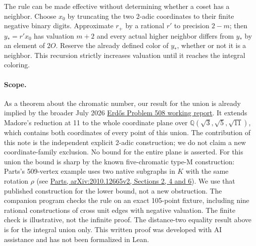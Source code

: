 \documentclass[10pt,letterpaper]{article}
\begin{document}
The rule can be made effective without determining whether a coset
has a neighbor. Choose \(x_0\) by truncating the two \(2\)-adic
coordinates to their finite negative binary digits. Approximate
\(r_+\) by a rational \(r'\) to precision \(2-m\);
then \(y_*=r'x_0\) has valuation \(m+2\) and every actual higher
neighbor differs from \(y_*\) by an element of \(2O\).
Reserve the already defined color of \(y_*\), whether or not it is
a neighbor. This recursion strictly increases valuation until it
reaches the integral coloring.

\paragraph{Scope.}
As a theorem about the chromatic number, our result for the union is already
implied by the broader July 2026
\href{https://www.erdosproblemaday.com/report/508}{Erd\H{o}s Problem 508
working report}. It extends Madore's reduction at 11 to the whole
coordinate plane over \(\mathbb Q(\sqrt3,\sqrt5,\sqrt{11})\), which contains
both coordinates of every point of this union. The contribution of this note
is the independent explicit \(2\)-adic construction; we do not claim a new
coordinate-family exclusion. No bound for the entire plane is asserted. For this union the bound is sharp by
the known five-chromatic type-M construction: Parts's 509-vertex
example uses two native subgraphs in \(K\) with the same rotation
\(\rho\) (see \href{https://arxiv.org/html/2010.12665v2}{Parts,
arXiv:2010.12665v2, Sections 2, 4 and 6}). We use that published
construction for the lower bound, not a new obstruction.
The companion program checks the rule on an exact 105-point fixture,
including nine rational constructions of cross unit edges with negative
valuation. The finite check is illustrative, not the infinite proof.
The distance-two equality result above is for the integral union
only. This written proof was developed with AI assistance and has
not been formalized in Lean.
\end{document}
